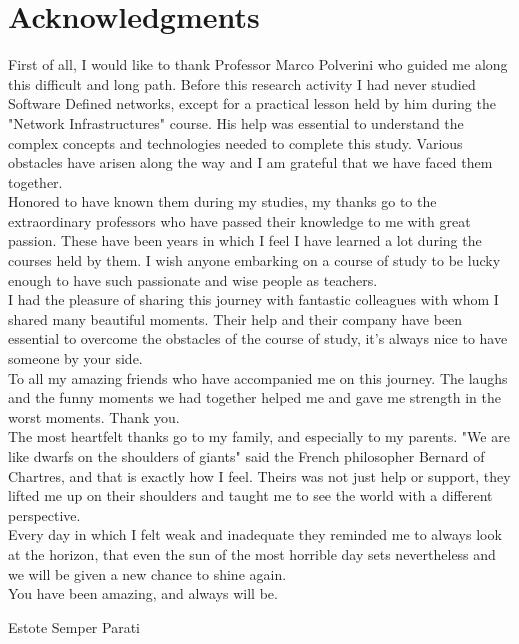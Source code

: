 \chapter*{Acknowledgments}

First of all, I would like to thank Professor Marco Polverini who guided me along this difficult and long path. Before this research activity I had never studied Software Defined networks, except for a practical lesson held by him during the "Network Infrastructures" course. His help was essential to understand the complex concepts and technologies needed to complete this study. Various obstacles have arisen along the way and I am grateful that we have faced them together.\\

Honored to have known them during my studies, my thanks go to the extraordinary professors who have passed their knowledge to me with great passion. These have been years in which I feel I have learned a lot during the courses held by them. I wish anyone embarking on a course of study to be lucky enough to have such passionate and wise people as teachers.\\

I had the pleasure of sharing this journey with fantastic colleagues with whom I shared many beautiful moments. Their help and their company have been essential to overcome the obstacles of the course of study, it's always nice to have someone by your side.\\

To all my amazing friends who have accompanied me on this journey. The laughs and the funny moments we had together helped me and gave me strength in the worst moments. Thank you.\\

The most heartfelt thanks go to my family, and especially to my parents. 
"We are like dwarfs on the shoulders of giants" said the French philosopher Bernard of Chartres, and that is exactly how I feel. 
Theirs was not just help or support, they lifted me up on their shoulders and taught me to see the world with a different perspective.\\
Every day in which I felt weak and inadequate they reminded me to always look at the horizon, that even the sun of the most horrible day sets nevertheless and we will be given a new chance to shine again.\\
You have been amazing, and always will be.\\

\bigskip

Estote Semper Parati


